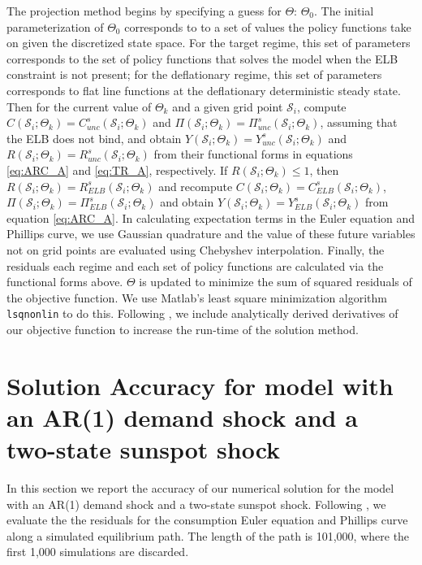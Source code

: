 \documentclass[11pt]{article}
\begin{document}
\begin{singlespace}
	The projection method begins by specifying a guess for $\Theta$: $\Theta_0$. The initial parameterization of $\Theta_0$ corresponds to to a set of values the policy functions take on given the discretized state space. For the target regime, this set of parameters corresponds to the set of policy functions that solves the model when the ELB constraint is not present; for the deflationary regime, this set of parameters corresponds to flat line functions at the deflationary deterministic steady state. Then for the current value of $\Theta_k$ and a given grid point $\mathcal{S}_i$, compute $C(\mathcal{S}_{i};\Theta_{k}) = C_{unc}^s(\mathcal{S}_{i};\Theta_{k})$ and $\Pi(\mathcal{S}_{i};\Theta_{k}) = \Pi_{unc}^s(\mathcal{S}_{i};\Theta_{k})$, assuming that the ELB does not bind, and obtain $Y(\mathcal{S}_{i};\Theta_{k}) = Y_{unc}^s(\mathcal{S}_{i};\Theta_{k})$ and $R(\mathcal{S}_{i};\Theta_{k}) = R_{unc}^s(\mathcal{S}_{i};\Theta_{k})$ from their functional forms in equations \ref{eq:ARC_A} and \ref{eq:TR_A}, respectively. If $R(\mathcal{S}_{i};\Theta_{k})\le 1$, then $R(\mathcal{S}_{i};\Theta_{k}) = R_{ELB}^s(\mathcal{S}_{i};\Theta_{k})$ and recompute $C(\mathcal{S}_{i};\Theta_{k}) = C_{ELB}^s(\mathcal{S}_{i};\Theta_{k})$, $\Pi(\mathcal{S}_{i};\Theta_{k}) = \Pi_{ELB}^s(\mathcal{S}_{i};\Theta_{k})$ and obtain $Y(\mathcal{S}_{i};\Theta_{k}) = Y_{ELB}^s(\mathcal{S}_{i};\Theta_{k})$ from equation \ref{eq:ARC_A}. In calculating expectation terms in the Euler equation and Phillips curve, we use Gaussian quadrature and the value of these future variables not on grid points are evaluated using Chebyshev interpolation. Finally, the residuals each regime and each set of policy functions are calculated via the functional forms above. $\Theta$ is updated to minimize the sum of squared residuals of the objective function. We use Matlab's least square minimization algorithm \texttt{lsqnonlin}  to do this. Following \citet{AruobaCubaBordaSchorfheide2018}, we include analytically derived derivatives of our objective function to increase the run-time of the solution method.  
	
	\section{Solution Accuracy for model with an AR(1) demand shock and a two-state sunspot shock}
	\label{A:SolutionAccuracy}
	
	In this section we report the accuracy of our numerical solution for the model with an AR(1) demand shock and a two-state sunspot shock. Following \citet{MaliarMaliar2015}, we evaluate the the residuals for the consumption Euler equation and Phillips curve along a simulated equilibrium path. The length of the path is 101,000, where the first 1,000 simulations are discarded. 
	

\end{singlespace}
\end{document}
